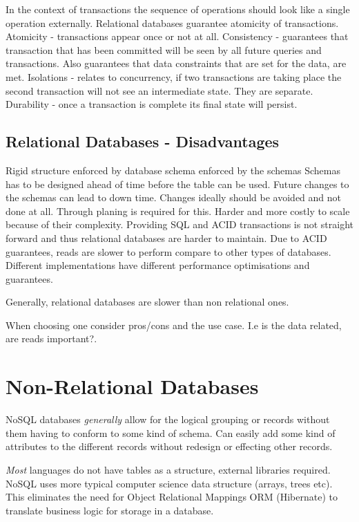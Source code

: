 In the context of transactions the sequence of operations should look like a single operation externally.
Relational databases guarantee atomicity of transactions.
Atomicity - transactions appear once or not at all.
Consistency - guarantees that transaction that has been committed will be seen by all future queries and transactions.
Also guarantees that data constraints that are set for the data, are met.
Isolations - relates to concurrency, if two transactions are taking place the second transaction will not see an intermediate state. They are separate.
Durability - once a transaction is complete its final state will persist.

\subsection{Relational Databases - Disadvantages}
Rigid structure enforced by database schema enforced by the schemas
Schemas has to be designed ahead of time before the table can be used.
Future changes to the schemas can lead to down time.
Changes ideally should be avoided and not done at all.
Through planing is required for this.
Harder and more costly to scale because of their complexity.
Providing SQL and ACID transactions is not straight forward and thus relational databases are harder to maintain.
Due to ACID guarantees, reads are slower to perform compare to other types of databases.
Different implementations have different performance optimisations and guarantees.

\begin{note}
    Generally, relational databases are slower than non relational ones.
\end{note}

When choosing one consider pros/cons and the use case.
I.e is the data related, are reads important?.


\section{Non-Relational Databases}

NoSQL databases \textit{generally} allow for the logical grouping or records without them having to conform to some kind of schema.
Can easily add some kind of attributes to the different records without redesign or effecting other records.

\textit{Most} languages do not have tables as a structure, external libraries required.
NoSQL uses more typical computer science data structure (arrays, trees etc).
This eliminates the need for Object Relational Mappings ORM (Hibernate) to translate business logic for storage in a database.

